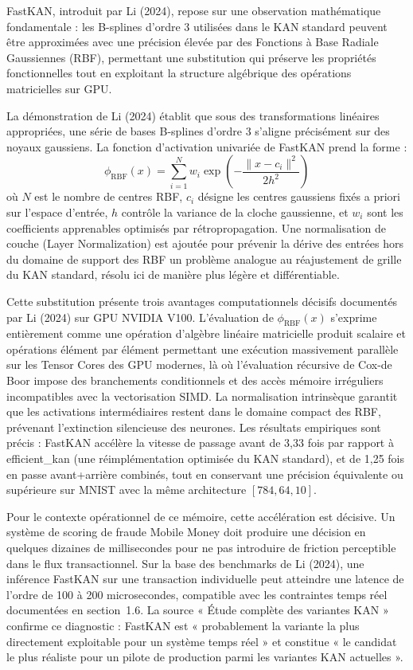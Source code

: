 \documentclass[11pt,a4paper,oneside]{report}
\theoremstyle{definition}
\theoremstyle{remark}
\begin{document}
FastKAN, introduit par Li (2024), repose sur une observation mathématique fondamentale : les B-splines d'ordre 3 utilisées dans le KAN standard peuvent être approximées avec une précision élevée par des Fonctions à Base Radiale Gaussiennes (RBF), permettant une substitution qui préserve les propriétés fonctionnelles tout en exploitant la structure algébrique des opérations matricielles sur GPU.

La démonstration de Li (2024) établit que sous des transformations linéaires appropriées, une série de bases B-splines d'ordre 3 s'aligne précisément sur des noyaux gaussiens. La fonction d'activation univariée de FastKAN prend la forme :
\begin{equation}
\phi_{\text{RBF}}(x) = \sum_{i=1}^{N} w_i \exp\left(-\frac{\|x - c_i\|^2}{2h^2}\right)
\end{equation}
où $N$ est le nombre de centres RBF, $c_i$ désigne les centres gaussiens fixés a priori sur l'espace d'entrée, $h$ contrôle la variance de la cloche gaussienne, et $w_i$ sont les coefficients apprenables optimisés par rétropropagation. Une normalisation de couche (Layer Normalization) est ajoutée pour prévenir la dérive des entrées hors du domaine de support des RBF  un problème analogue au réajustement de grille du KAN standard, résolu ici de manière plus légère et différentiable.

Cette substitution présente trois avantages computationnels décisifs documentés par Li (2024) sur GPU NVIDIA V100. L'évaluation de $\phi_{\text{RBF}}(x)$ s'exprime entièrement comme une opération d'algèbre linéaire matricielle  produit scalaire et opérations élément par élément  permettant une exécution massivement parallèle sur les Tensor Cores des GPU modernes, là où l'évaluation récursive de Cox-de Boor impose des branchements conditionnels et des accès mémoire irréguliers incompatibles avec la vectorisation SIMD. La normalisation intrinsèque garantit que les activations intermédiaires restent dans le domaine compact des RBF, prévenant l'extinction silencieuse des neurones. Les résultats empiriques sont précis : FastKAN accélère la vitesse de passage avant de 3,33 fois par rapport à efficient\_kan (une réimplémentation optimisée du KAN standard), et de 1,25 fois en passe avant+arrière combinés, tout en conservant une précision équivalente ou supérieure sur MNIST avec la même architecture $[784, 64, 10]$.

Pour le contexte opérationnel de ce mémoire, cette accélération est décisive. Un système de scoring de fraude Mobile Money doit produire une décision en quelques dizaines de millisecondes pour ne pas introduire de friction perceptible dans le flux transactionnel. Sur la base des benchmarks de Li (2024), une inférence FastKAN sur une transaction individuelle peut atteindre une latence de l'ordre de 100 à 200 microsecondes, compatible avec les contraintes temps réel documentées en section~1.6. La source « Étude complète des variantes KAN » confirme ce diagnostic : FastKAN est « probablement la variante la plus directement exploitable pour un système temps réel » et constitue « le candidat le plus réaliste pour un pilote de production parmi les variantes KAN actuelles ».
\end{document}
